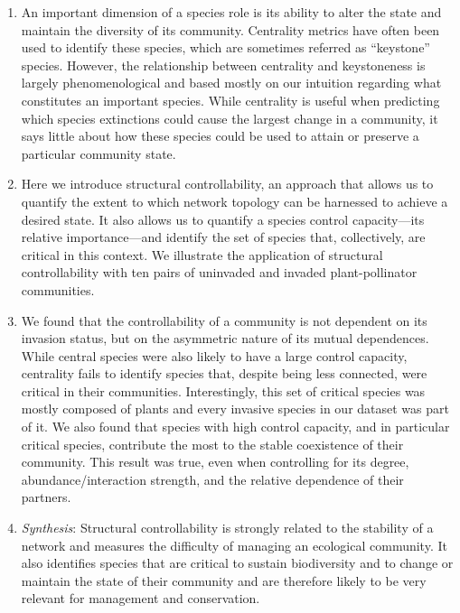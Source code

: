 \documentclass[a4paper]{artikel1}
\theoremstyle{definition}
\theoremstyle{definition}
\theoremstyle{definition}
\theoremstyle{remark}
\begin{document}
\begin{enumerate}
\def\labelenumi{\arabic{enumi}.}
\item
  An important dimension of a species role is its ability to alter the
  state and maintain the diversity of its community. Centrality metrics
  have often been used to identify these species, which are sometimes
  referred as ``keystone'' species. However, the relationship between
  centrality and keystoneness is largely phenomenological and based
  mostly on our intuition regarding what constitutes an important
  species. While centrality is useful when predicting which species
  extinctions could cause the largest change in a community, it says
  little about how these species could be used to attain or preserve a
  particular community state.
\item
  Here we introduce structural controllability, an approach that allows
  us to quantify the extent to which network topology can be harnessed
  to achieve a desired state. It also allows us to quantify a species
  control capacity---its relative importance---and identify the set of
  species that, collectively, are critical in this context. We
  illustrate the application of structural controllability with ten
  pairs of uninvaded and invaded plant-pollinator communities.
\item
  We found that the controllability of a community is not dependent on
  its invasion status, but on the asymmetric nature of its mutual
  dependences. While central species were also likely to have a large
  control capacity, centrality fails to identify species that, despite
  being less connected, were critical in their communities.
  Interestingly, this set of critical species was mostly composed of
  plants and every invasive species in our dataset was part of it. We
  also found that species with high control capacity, and in particular
  critical species, contribute the most to the stable coexistence of
  their community. This result was true, even when controlling for its
  degree, abundance/interaction strength, and the relative dependence of
  their partners.
\item
  \emph{Synthesis}: Structural controllability is strongly related to
  the stability of a network and measures the difficulty of managing an
  ecological community. It also identifies species that are critical to
  sustain biodiversity and to change or maintain the state of their
  community and are therefore likely to be very relevant for management
  and conservation.
\end{enumerate}
\end{document}
